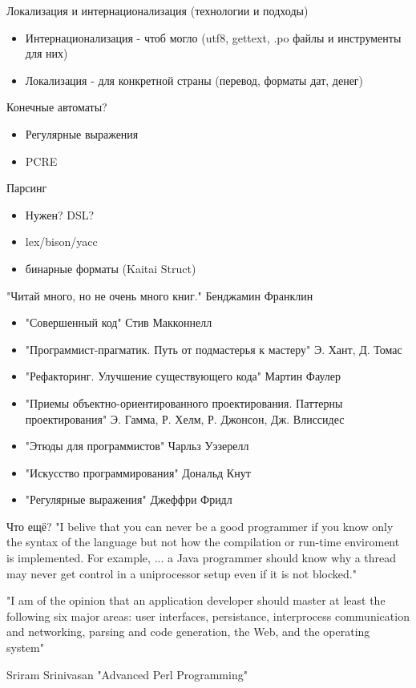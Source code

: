 \documentclass[aspectratio=169]{beamer}
\begin{document}
\begin{frame}{Локализация и интернационализация (технологии и подходы)}
\begin{itemize}
\item Интернационализация - чтоб могло (utf8, gettext, .po файлы и инструменты для них)
\pause
\item Локализация - для конкретной страны (перевод, форматы дат, денег)
\end{itemize}
\end{frame}

\begin{frame}{Конечные автоматы?}
\begin{itemize}
\item Регулярные выражения
\pause
\item PCRE
\end{itemize}
\end{frame}

\begin{frame}{Парсинг}
\begin{itemize}
\item Нужен? DSL?
\pause
\item lex/bison/yacc
\pause
\item бинарные форматы (Kaitai Struct)
\end{itemize}
\end{frame}


\begin{frame}{"Читай много, но не очень много книг." Бенджамин Франклин}
\begin{itemize}
\item "Совершенный код" Стив Макконнелл
\pause
\item "Программист-прагматик. Путь от подмастерья к мастеру" Э. Хант, Д. Томас
\pause
\item "Рефакторинг. Улучшение существующего кода" Мартин Фаулер
\pause
\item "Приемы объектно-ориентированного проектирования. Паттерны проектирования" Э. Гамма, Р. Хелм, Р. Джонсон, Дж. Влиссидес
\pause
\item "Этюды для программистов" Чарльз Уэзерелл
\pause
\item "Искусство программирования" Дональд Кнут
\pause
\item "Регулярные выражения" Джеффри Фридл
\end{itemize}
\end{frame}

\begin{frame}{Что ещё?}
"I belive that you can never be a good programmer if you know only the syntax of the language but not how the compilation or run-time enviroment is implemented. For example, ... a Java programmer should know why a thread may never get control in a uniprocessor setup even if it is not blocked."

"I am of the opinion that an application developer should master at least the following six major areas: user interfaces, persistance, interprocess communication and networking, parsing and code generation, the Web, and the operating system"

Sriram Srinivasan "Advanced Perl Programming"
\end{frame}
\end{document}
